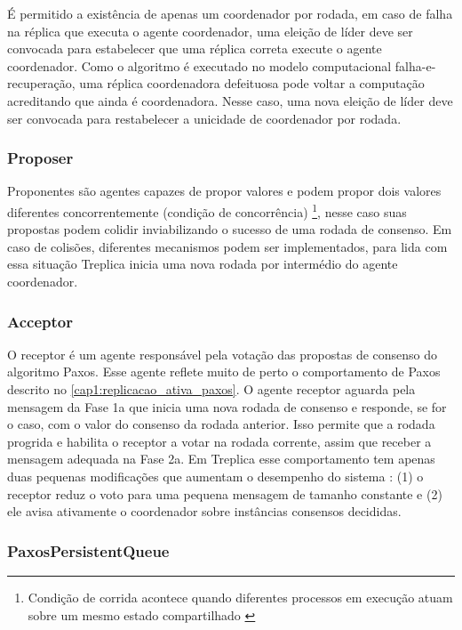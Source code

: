 É permitido a existência de apenas um coordenador por rodada, em caso de falha na réplica
que executa o agente coordenador, uma eleição de líder deve ser convocada para estabelecer
que uma réplica correta execute o agente coordenador. Como o algoritmo é executado no
modelo computacional falha-e-recuperação, uma réplica coordenadora defeituosa pode voltar
a computação acreditando que ainda é coordenadora. Nesse caso, uma nova eleição de líder
deve ser convocada para restabelecer a unicidade de coordenador por rodada.

\subsubsection{Proposer}

Proponentes são agentes capazes de propor valores e podem propor dois valores diferentes
concorrentemente (condição de concorrência) \footnote{Condição de corrida acontece quando
diferentes processos em execução atuam sobre um mesmo estado compartilhado
\cite{goetz06}}, nesse caso suas propostas podem colidir inviabilizando o sucesso de uma
rodada de consenso. Em caso de colisões, diferentes mecanismos podem ser implementados,
para lida com essa situação Treplica inicia uma nova rodada por intermédio do agente
coordenador.

\subsubsection{Acceptor}

O receptor é um agente responsável pela votação das propostas de consenso do algoritmo
Paxos. Esse agente reflete muito de perto o comportamento de Paxos descrito no
\autoref{cap1:replicacao_ativa_paxos}. O agente receptor aguarda pela mensagem da Fase 1a
que inicia uma nova rodada de consenso e responde, se for o caso, com o valor do consenso
da rodada anterior. Isso permite que a rodada progrida e habilita o receptor a votar na
rodada corrente, assim que receber a mensagem adequada na Fase 2a. Em Treplica esse
comportamento tem apenas duas pequenas modificações que aumentam o desempenho do sistema
\cite{vieira-tr10b}: (1) o receptor reduz o voto para uma pequena mensagem de tamanho
constante e (2) ele avisa ativamente o coordenador sobre instâncias consensos decididas.

\subsubsection{PaxosPersistentQueue}

